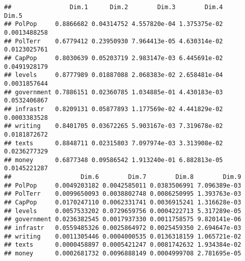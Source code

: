 \documentclass[
]{article}
\newenvironment{Shaded}{\begin{snugshade}}{\end{snugshade}}
\newcommand{\NormalTok}[1]{#1}
\newcommand{\OperatorTok}[1]{\textcolor[rgb]{0.81,0.36,0.00}{\textbf{#1}}}
\begin{document}
\begin{verbatim}
##                Dim.1      Dim.2        Dim.3        Dim.4        Dim.5
## PolPop     0.8866682 0.04314752 4.557820e-04 1.375375e-02 0.0013488258
## PolTerr    0.6779412 0.23950930 7.964413e-05 4.630314e-02 0.0123025761
## CapPop     0.8030639 0.05203719 2.983147e-03 6.445691e-02 0.0491928179
## levels     0.8777989 0.01887088 2.068383e-02 2.658481e-04 0.0031857644
## government 0.7886151 0.02360785 1.034885e-01 4.430183e-03 0.0532406867
## infrastr   0.8209131 0.05877893 1.177569e-02 4.441829e-02 0.0003383528
## writing    0.8401705 0.03672265 5.903167e-03 7.319678e-02 0.0181872672
## texts      0.8848711 0.02315803 7.097974e-03 3.313908e-02 0.0236277329
## money      0.6877348 0.09586542 1.913240e-01 6.882813e-05 0.0145221287
##                   Dim.6        Dim.7        Dim.8        Dim.9
## PolPop     0.0049203182 0.0042585011 0.0383506991 7.096389e-03
## PolTerr    0.0099650093 0.0038802748 0.0086250995 1.393763e-03
## CapPop     0.0170247110 0.0062331741 0.0036915241 1.316628e-03
## levels     0.0057533202 0.0729659756 0.0004222713 5.317289e-05
## government 0.0236382545 0.0017937330 0.0011758575 9.820141e-06
## infrastr   0.0559485326 0.0025864972 0.0025459350 2.694647e-03
## writing    0.0011305446 0.0004000535 0.0136318159 1.065721e-02
## texts      0.0000458897 0.0005421247 0.0081742632 1.934384e-02
## money      0.0002681732 0.0096888149 0.0004999708 2.781695e-05
\end{verbatim}

\begin{Shaded}
\end{Shaded}
\end{document}
